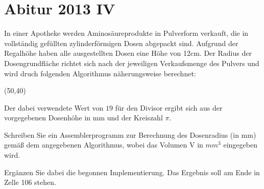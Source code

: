 \documentclass{lehramt-informatik-aufgabe}
\begin{document}

\section{Abitur 2013 IV}

In einer Apotheke werden Aminosäureprodukte in Pulverform verkauft, die
in vollständig gefüllten zylinderförmigen Dosen abgepackt sind. Aufgrund
der Regalhöhe haben alle ausgestellten Dosen eine Höhe von 12cm. Der
Radius der Dosengrundfläche richtet sich nach der jeweiligen
Verkaufsmenge des Pulvers und wird druch folgenden Algorithmus
näherungsweise berechnet:

\begin{struktogramm}(50,40)
 \whileend
{}
\end{struktogramm}

Der dabei verwendete Wert von $19$ für den Divisor ergibt sich aus der
vorgegebenen Dosenhöhe in mm und der Kreiszahl $\pi$.

Schreiben Sie ein Assemblerprogramm zur Berechnung des Dosenradius (in
mm) gemäß dem angegebenen Algorithmus, wobei das Volumen V in $mm^3$
eingegeben wird.

Ergänzen Sie dabei die begonnen Implementierung. Das Ergebnis soll am
Ende in Zelle 106 stehen.

\end{document}
